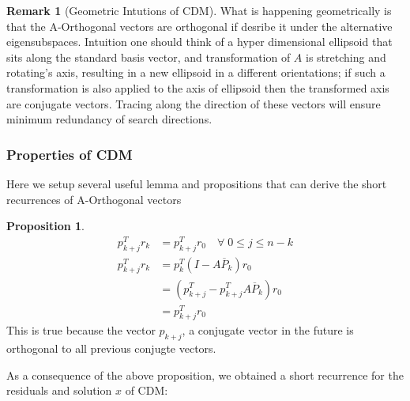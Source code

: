\documentclass[]{article}
\theoremstyle{definition}
\newtheorem{prop}{Proposition}[section]  %
\newtheorem{remark}{Remark}[subsection]
\begin{document}
            \begin{remark}[Geometric Intutions of CDM]
                What is happening geometrically is that the A-Orthogonal vectors are orthogonal if desribe it under the alternative eigensubspaces. Intuition one should think of a hyper dimensional ellipsoid that sits along the standard basis vector, and transformation of $A$ is stretching and rotating's axis, resulting in a new ellipsoid in a different orientations; if such a transformation is also applied to the axis of ellipsoid then the transformed axis are conjugate vectors. Tracing along the direction of these vectors will ensure minimum redundancy of search directions. 
            \end{remark}
        \subsubsection{Properties of CDM}
            Here we setup several useful lemma and propositions that can derive the short recurrences of A-Orthogonal vectors 
            \begin{prop}
                \begin{align}
                    p_{k + j}^Tr_k &= p_{k + j}^Tr_0 \quad \forall \; 0 \le j \le n - k
                    \\
                    p_{k + j}^Tr_k &= p_k^T(I - A\overline{P}_k)r_0
                    \\
                    &= (p^T_{k + j} - p^T_{k + j}A\overline{P}_k)r_0
                    \\
                    &= p_{k + j}^Tr_0    
                \end{align}
                This is true because the vector $p_{k + j}$, a conjugate vector in the future is orthogonal to all previous conjugte vectors. 
            \end{prop}
            As a consequence of the above proposition, we obtained a short recurrence for the residuals and solution $x$ of CDM: 
\end{document}
